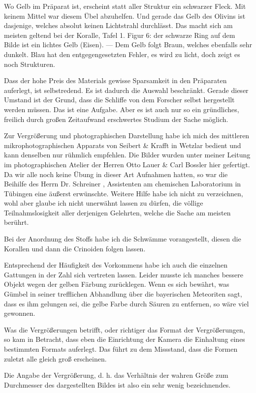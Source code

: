 \documentclass[a4paper, 12pt, oneside]{article}
\begin{document}
Wo Gelb im Präparat ist, erscheint statt aller Struktur ein schwarzer Fleck. Mit keinem Mittel war diesem Übel abzuhelfen. Und gerade das Gelb des Olivins ist dasjenige, welches absolut keinen Lichtstrahl durchlässt. Das macht sich am meisten geltend bei der Koralle, Tafel 1. Figur 6: der schwarze Ring auf dem Bilde ist ein lichtes Gelb (Eisen). — Dem Gelb folgt Braun, welches ebenfalls sehr dunkelt. Blau hat den entgegengesetzten Fehler, es wird zu licht, doch zeigt es noch Strukturen.

Dass der hohe Preis des Materials gewisse Sparsamkeit in den Präparaten auferlegt, ist selbstredend. Es ist dadurch die Auswahl beschränkt. Gerade dieser Umstand ist der Grund, dass die Schliffe von dem Forscher selbst hergestellt werden müssen. Das ist eine Aufgabe. Aber es ist auch nur so ein gründliches, freilich durch großen Zeitaufwand erschwertes Studium der Sache möglich.

Zur Vergrößerung und photographischen Darstellung habe ich mich des mittleren mikrophotographischen Apparats von Seibert \& Krafft in Wetzlar bedient und kann denselben nur rühmlich empfehlen. Die Bilder wurden unter meiner Leitung im photographischen Atelier der Herren Otto Lauer \& Carl Bossler hier gefertigt. Da wir alle noch keine Übung in dieser Art Aufnahmen hatten, so war die Beihilfe des Herrn Dr. Schreiner , Assistenten am chemischen Laboratorium in Tübingen eine äußerst erwünschte. Weitere Hilfe habe ich nicht zu verzeichnen, wohl aber glaube ich nicht unerwähnt lassen zu dürfen, die völlige Teilnahmslosigkeit aller derjenigen Gelehrten, welche die Sache am meisten berührt.

Bei der Anordnung des Stoffs habe ich die Schwämme vorangestellt, diesen die Korallen und dann die Crinoiden folgen lassen.

Entsprechend der Häufigkeit des Vorkommens habe ich auch die einzelnen Gattungen in der Zahl sich vertreten lassen. Leider musste ich manches bessere Objekt wegen der gelben Färbung zurücklegen. Wenn es sich bewährt, was Gümbel in seiner trefflichen Abhandlung über die bayerischen Meteoriten sagt, dass es ihm gelungen sei, die gelbe Farbe durch Säuren zu entfernen, so wäre viel gewonnen.

Was die Vergrößerungen betrifft, oder richtiger das Format der Vergrößerungen, so kam in Betracht, dass eben die Einrichtung der Kamera die Einhaltung eines bestimmten Formats auferlegt. Das führt zu dem Missstand, dass die Formen zuletzt alle gleich groß erscheinen.

Die Angabe der Vergrößerung, d. h. das Verhältnis der wahren Größe zum Durchmesser des dargestellten Bildes ist also ein sehr wenig bezeichnendes.
\end{document}
